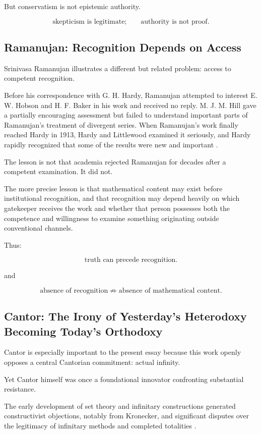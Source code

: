 \documentclass[11pt,a4paper]{article}
\begin{document}
But conservatism is not epistemic authority.

\[
\boxed{
\text{skepticism is legitimate;}
\qquad
\text{authority is not proof}.
}
\]

\subsection{Ramanujan: Recognition Depends on Access}

Srinivasa Ramanujan illustrates a different but related problem:
access to competent recognition.

Before his correspondence with G. H. Hardy, Ramanujan attempted to
interest E. W. Hobson and H. F. Baker in his work and received no
reply. M. J. M. Hill gave a partially encouraging assessment but failed
to understand important parts of Ramanujan's treatment of divergent
series. When Ramanujan's work finally reached Hardy in 1913, Hardy and
Littlewood examined it seriously, and Hardy rapidly recognized that
some of the results were new and important
\cite{MacTutorRamanujan}.

The lesson is not that academia rejected Ramanujan for decades after a
competent examination. It did not.

The more precise lesson is that mathematical content may exist before
institutional recognition, and that recognition may depend heavily on
which gatekeeper receives the work and whether that person possesses
both the competence and willingness to examine something originating
outside conventional channels.

Thus:

\[
\boxed{
\text{truth can precede recognition}.
}
\]

and

\[
\boxed{
\text{absence of recognition}
\not\Rightarrow
\text{absence of mathematical content}.
}
\]

\subsection{Cantor: The Irony of Yesterday's Heterodoxy Becoming Today's Orthodoxy}

Cantor is especially important to the present essay because this work
openly opposes a central Cantorian commitment: actual infinity.

Yet Cantor himself was once a foundational innovator confronting
substantial resistance.

The early development of set theory and infinitary constructions
generated constructivist objections, notably from Kronecker, and
significant disputes over the legitimacy of infinitary methods and
completed totalities \cite{SEPEarlySetTheory}.
\end{document}
